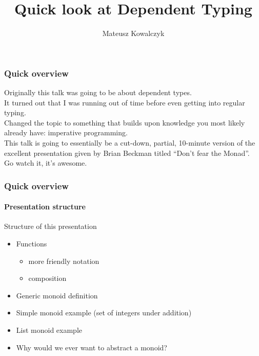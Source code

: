 \documentclass{beamer}
\title[Dependent Types]{Quick look at Dependent Typing}
\author{Mateusz Kowalczyk}
\institute{University of Bath}
\begin{document}
\begin{frame}
  \titlepage
\end{frame}
\begin{frame}
  \frametitle{Quick overview}
  Originally this talk was going to be about dependent types.\\
  \pause
  It turned out that I was running out of time before even getting
  into regular typing.\\
  \pause
  Changed the topic to something that builds upon knowledge you most
  likely already have: imperative programming.\\
  \pause
  This talk is going to essentially be a cut-down, partial, 10-minute
  version of the excellent presentation given by Brian Beckman titled
  ``Don't fear the Monad''.\\
  \pause
  Go watch it, it's awesome.
\end{frame}
\begin{frame}
  \frametitle{Quick overview}
  \framesubtitle{Presentation structure}
  Structure of this presentation
  \begin{itemize}[<+->]
    \item Functions
      \begin{itemize}
        \item more friendly notation
        \item composition
      \end{itemize}
    \item Generic monoid definition
    \item Simple monoid example (set of integers under addition)
    \item List monoid example
    \item Why would we ever want to abstract a monoid?
  \end{itemize}
\end{frame}
\end{document}
